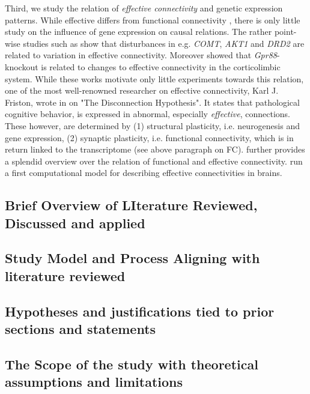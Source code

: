 \documentclass[]{article}
\renewcommand{\cite}{\citep}
\begin{document}
Third, we study the relation of \textit{effective connectivity} and genetic expression patterns. While effective differs from functional connectivity \cite{bauer2018effective}, there is only little study on the influence of gene expression on causal relations. The rather point-wise studies such as \citet{tan2012effective} show that disturbances in e.g. \textit{COMT}, \textit{AKT1} and \textit{DRD2} are related to variation in effective connectivity. Moreover \citet{hamida2018increased} showed that \textit{Gpr88}-knockout is related to changes to effective connectivity in the corticolimbic system. While these works motivate only little experiments towards this relation, one of the most well-renowned researcher on effective connectivity, Karl J. Friston, wrote in \citet{friston2002dysfunctional} on "The Disconnection Hypothesis". It states that pathological cognitive behavior, is expressed in abnormal, especially \textit{effective}, connections. These however, are determined by (1) structural plasticity, i.e. neurogenesis and gene expression, (2) synaptic plasticity, i.e. functional connectivity, which is in return linked to the transcriptome (see above paragraph on FC). \citet{friston2011functional} further provides a splendid overview over the relation of functional and effective connectivity. \citet{lepperod2018inferring} run a first computational model for describing effective connectivities in brains.



\subsection*{Brief Overview of LIterature Reviewed, Discussed and applied}

\subsection*{Study Model and Process Aligning with literature reviewed}

\subsection*{Hypotheses and justifications tied to prior sections and statements}

\subsection*{The Scope of the study with theoretical assumptions and limitations}
\end{document}
